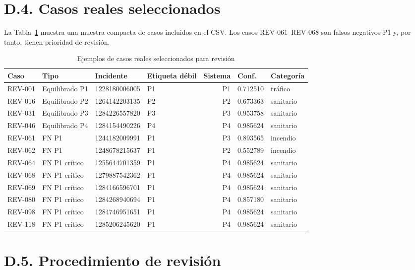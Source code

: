 \section*{D.4. Casos reales seleccionados}

La Tabla~\ref{tab:anexod-casos} muestra una muestra compacta de casos incluidos en el
CSV. Los casos REV-061--REV-068 son falsos negativos P1 y, por tanto, tienen prioridad
de revisión.

\begin{table}[ht]
\centering
\caption{Ejemplos de casos reales seleccionados para revisión}
\label{tab:anexod-casos}
\scriptsize
\begin{tabular}{|l|l|l|l|r|l|l|}
\hline
\textbf{Caso} & \textbf{Tipo} & \textbf{Incidente} & \textbf{Etiqueta débil} & \textbf{Sistema} & \textbf{Conf.} & \textbf{Categoría} \\ \hline
REV-001 & Equilibrado P1 & 1228180006005 & P1 & P1 & 0.712510 & tráfico \\ \hline
REV-016 & Equilibrado P2 & 1264142203135 & P2 & P2 & 0.673363 & sanitario \\ \hline
REV-031 & Equilibrado P3 & 1284226557820 & P3 & P3 & 0.953758 & sanitario \\ \hline
REV-046 & Equilibrado P4 & 1284154490226 & P4 & P4 & 0.985624 & sanitario \\ \hline
REV-061 & FN P1 & 1244182009991 & P1 & P3 & 0.893565 & incendio \\ \hline
REV-062 & FN P1 & 1248678215637 & P1 & P2 & 0.552789 & incendio \\ \hline
REV-064 & FN P1 crítico & 1255644701359 & P1 & P4 & 0.985624 & sanitario \\ \hline
REV-068 & FN P1 crítico & 1279887542362 & P1 & P4 & 0.985624 & sanitario \\ \hline
REV-069 & FN P1 crítico & 1284166596701 & P1 & P4 & 0.985624 & sanitario \\ \hline
REV-080 & FN P1 crítico & 1284268940694 & P1 & P4 & 0.857180 & sanitario \\ \hline
REV-098 & FN P1 crítico & 1284746951651 & P1 & P4 & 0.985624 & sanitario \\ \hline
REV-118 & FN P1 crítico & 1285206245620 & P1 & P4 & 0.985624 & sanitario \\ \hline
\end{tabular}
\end{table}

\section*{D.5. Procedimiento de revisión}

